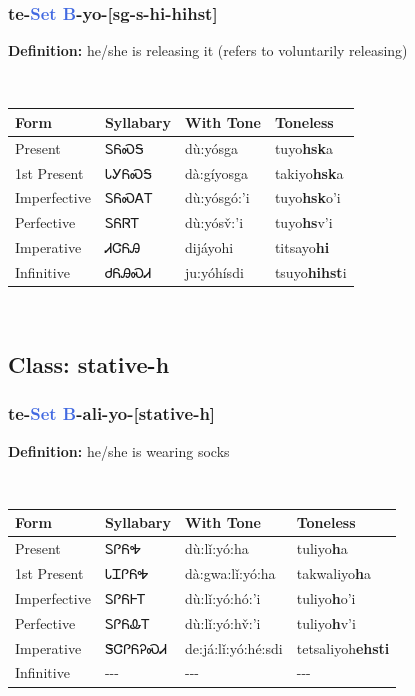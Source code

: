 \subsubsection*{te{-}\textcolor{RoyalBlue}{Set B}{-}\textbf{yo}{-}[sg-s-hi-hihst]}
\nopagebreak
\textbf{Definition: } he/she is releasing it (refers to voluntarily releasing)
\\[0.5em]
\begin{tabularx}{\textwidth}{l X X X}%
\toprule%
\textbf{Form}&\textbf{Syllabary}&\textbf{With Tone}&\textbf{Toneless}\\%
\midrule%
Present&ᏚᏲᏍᎦ&dù:yósga&tuyo\textbf{hsk}a\\%
1st Present&ᏓᎩᏲᏍᎦ&dà:gíyosga&takiyo\textbf{hsk}a\\%
Imperfective&ᏚᏲᏍᎪᎢ&dù:yósgó:’i&tuyo\textbf{hsk}o'i\\%
Perfective&ᏚᏲᏒᎢ&dù:yósv̌:’i&tuyo\textbf{hs}v'i\\%
Imperative&ᏗᏣᏲᎯ&dijáyohi&titsayo\textbf{hi}\\%
Infinitive&ᏧᏲᎯᏍᏗ&ju:yóhísdi&tsuyo\textbf{hihst}i\\%
\bottomrule%
\end{tabularx}
\\[1em]
\needspace{3in}
\subsection*{Class: stative-h}
\nopagebreak
\needspace{2in}
\subsubsection*{te{-}\textcolor{RoyalBlue}{Set B}{-}ali{-}\textbf{yo}{-}[stative-h]}
\nopagebreak
\textbf{Definition: } he/she is wearing socks
\\[0.5em]
\begin{tabularx}{\textwidth}{l X X X}%
\toprule%
\textbf{Form}&\textbf{Syllabary}&\textbf{With Tone}&\textbf{Toneless}\\%
\midrule%
Present&ᏚᎵᏲᎭ&dù:lǐ:yó:ha&tuliyo\textbf{h}a\\%
1st Present&ᏓᏆᎵᏲᎭ&dà:gwa:lǐ:yó:ha&takwaliyo\textbf{h}a\\%
Imperfective&ᏚᎵᏲᎰᎢ&dù:lǐ:yó:hó:’i&tuliyo\textbf{h}o'i\\%
Perfective&ᏚᎵᏲᎲᎢ&dù:lǐ:yó:hv̌:’i&tuliyo\textbf{h}v'i\\%
Imperative&ᏕᏣᎵᏲᎮᏍᏗ&de:já:lǐ:yó:hé:sdi&tetsaliyoh\textbf{ehsti}\\%
Infinitive&{-}{-}{-}&{-}{-}{-}&{-}{-}{-}\\%
\bottomrule%
\end{tabularx}
\\[1em]